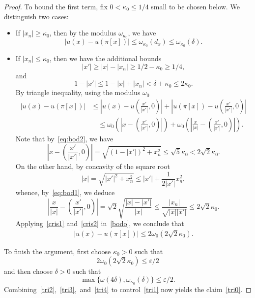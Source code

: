 \documentclass[10pt,a4paper]{amsart}
\newcommand{\vep}{\varepsilon}
\begin{document}
\begin{proof}
To bound the first term, fix $0 < \kappa_0 \leq 1/4$ small to be chosen below. 
We distinguish two cases:
\begin{itemize}
\item If $|x_n| \geq \kappa_0$, then by the modulus $\omega_{\kappa_0}$, we have
\begin{equation}
\label{tri3}
|u(x) - u(\pi[x])| \leq \omega_{\kappa_0}(d_x) \leq \omega_{\kappa_0}(\delta).
\end{equation}
\item If $|x_n| \leq \kappa_0$, then we have the additional bounds
\begin{equation}
\label{eq:bod1}
|x'| \geq |x| - |x_n| \geq 1/2 - \kappa_0 \geq 1/4,
\end{equation}
and
\begin{equation}
\label{eq:bod2}
1 - |x'| \leq 1 - |x| + |x_n| < \delta + \kappa_0 \leq 2 \kappa_0.
\end{equation}
By triangle inequality, using the modulus $\omega_0$
\begin{equation}
\label{bodo}
\begin{split}
|u(x) - u(\pi[x])| &\leq \textstyle \left|u(x) - u(\frac{x'}{|x'|},0)\right| + \left| u(\pi[x]) - u(\frac{x'}{|x'|},0)\right|\\
& \quad \leq \textstyle 
\omega_0\left(\left|x -(\frac{x'}{|x'|},0) \right|\right) +  \omega_0\left(\left|\frac{x}{|x|} - (\frac{x'}{|x'|},0) \right| \right).
\end{split}
\end{equation}
Note that by~\eqref{eq:bod2}, we have
\begin{equation}
\label{cris1}
\textstyle
\left|x -(\frac{x'}{|x'|},0) \right| = \sqrt{(1- |x'|)^2 +x_n^2}
\leq \sqrt{5}\kappa_0 < 2 \sqrt{2} \kappa_0.
\end{equation}
On the other hand, by concavity of the square root
\[
|x| = \sqrt{|x'|^2+x_n^2} \leq |x'| + \frac{1}{2 |x'|}x_n^2,
\]
whence, by~\eqref{eq:bod1}, we deduce
\begin{equation}
\label{cris2}
\textstyle
\left|\frac{x}{|x|} - (\frac{x'}{|x'|},0) \right| = \sqrt{2}\sqrt{\frac{|x|-|x'|}{|x|}}
\leq \frac{|x_n|}{\sqrt{|x||x'|}}
\leq 2 \sqrt{2} \kappa_0.
\end{equation}
Applying~\eqref{cris1} and~\eqref{cris2} in~\eqref{bodo}, we conclude that
\begin{equation}
\label{tri4}
\begin{split}
|u(x) - u(\pi[x])| 
\leq 2 \omega_0(2 \sqrt{2} \kappa_0).
\end{split}
\end{equation}
\end{itemize}

\medskip

To finish the argument,
first choose $\kappa_0 > 0$ such that 
\[
2 \omega_0(2 \sqrt{2}\kappa_0) \leq \vep/2
\]
and then choose $\delta > 0$ such that
\[
\max\{ \omega(4\delta), \omega_{\kappa_0}(\delta) \} \leq \vep/2.
\]
Combining~\eqref{tri2},~\eqref{tri3},~and~\eqref{tri4} to control~\eqref{tri1} now yields the claim~\eqref{tri0}.
\end{proof}
\end{document}
